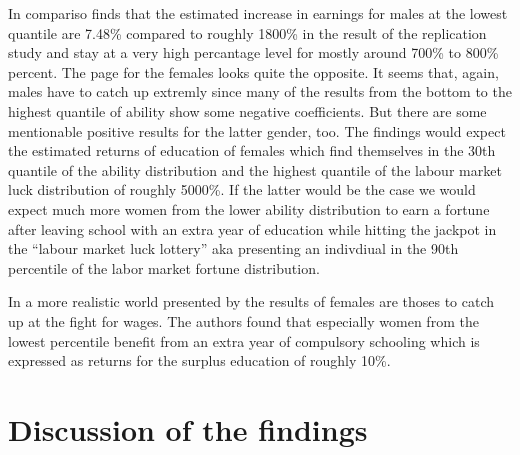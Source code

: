 \documentclass[12pt,a4paper]{article}
\begin{document}
In compariso \textcite{brunello} finds that the estimated increase in
earnings for males at the lowest quantile are 7.48\% compared to roughly
1800\% in the result of the replication study and stay at a very high
percantage level for mostly around 700\% to 800\% percent. The page for
the females looks quite the opposite. It seems that, again, males have
to catch up extremly since many of the results from the bottom to the
highest quantile of ability show some negative coefficients. But there
are some mentionable positive results for the latter gender, too. The
findings would expect the estimated returns of education of females
which find themselves in the 30th quantile of the ability distribution
and the highest quantile of the labour market luck distribution of
roughly 5000\%. If the latter would be the case we would expect much
more women from the lower ability distribution to earn a fortune after
leaving school with an extra year of education while hitting the jackpot
in the \enquote{labour market luck lottery} aka presenting an indivdiual
in the 90th percentile of the labor market fortune distribution.

In a more realistic world presented by the results of
\textcite{brunello} females are thoses to catch up at the fight for
wages. The authors found that especially women from the lowest
percentile benefit from an extra year of compulsory schooling which is
expressed as returns for the surplus education of roughly 10\%.

\hypertarget{discussion-of-the-findings}{%
\section{Discussion of the findings}\label{discussion-of-the-findings}}
\end{document}
